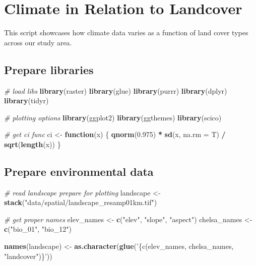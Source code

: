 \documentclass[]{article}
\newenvironment{Shaded}{\begin{snugshade}}{\end{snugshade}}
\newcommand{\CommentTok}[1]{\textcolor[rgb]{0.56,0.35,0.01}{\textit{#1}}}
\newcommand{\ControlFlowTok}[1]{\textcolor[rgb]{0.13,0.29,0.53}{\textbf{#1}}}
\newcommand{\DataTypeTok}[1]{\textcolor[rgb]{0.13,0.29,0.53}{#1}}
\newcommand{\FloatTok}[1]{\textcolor[rgb]{0.00,0.00,0.81}{#1}}
\newcommand{\KeywordTok}[1]{\textcolor[rgb]{0.13,0.29,0.53}{\textbf{#1}}}
\newcommand{\NormalTok}[1]{#1}
\newcommand{\OperatorTok}[1]{\textcolor[rgb]{0.81,0.36,0.00}{\textbf{#1}}}
\newcommand{\StringTok}[1]{\textcolor[rgb]{0.31,0.60,0.02}{#1}}
\begin{document}
\hypertarget{climate-in-relation-to-landcover}{%
\section{Climate in Relation to Landcover}\label{climate-in-relation-to-landcover}}

This script showcases how climate data varies as a function of land cover types across our study area.

\hypertarget{prepare-libraries-2}{%
\subsection{Prepare libraries}\label{prepare-libraries-2}}

\begin{Shaded}
\begin{Highlighting}[numbers=left,,]
\CommentTok{# load libs}
\KeywordTok{library}\NormalTok{(raster)}
\KeywordTok{library}\NormalTok{(glue)}
\KeywordTok{library}\NormalTok{(purrr)}
\KeywordTok{library}\NormalTok{(dplyr)}
\KeywordTok{library}\NormalTok{(tidyr)}

\CommentTok{# plotting options}
\KeywordTok{library}\NormalTok{(ggplot2)}
\KeywordTok{library}\NormalTok{(ggthemes)}
\KeywordTok{library}\NormalTok{(scico)}

\CommentTok{# get ci func}
\NormalTok{ci <-}\StringTok{ }\ControlFlowTok{function}\NormalTok{(x) \{}
  \KeywordTok{qnorm}\NormalTok{(}\FloatTok{0.975}\NormalTok{) }\OperatorTok{*}\StringTok{ }\KeywordTok{sd}\NormalTok{(x, }\DataTypeTok{na.rm =}\NormalTok{ T) }\OperatorTok{/}\StringTok{ }\KeywordTok{sqrt}\NormalTok{(}\KeywordTok{length}\NormalTok{(x))}
\NormalTok{\}}
\end{Highlighting}
\end{Shaded}

\hypertarget{prepare-environmental-data}{%
\subsection{Prepare environmental data}\label{prepare-environmental-data}}

\begin{Shaded}
\begin{Highlighting}[numbers=left,,]
\CommentTok{# read landscape prepare for plotting}
\NormalTok{landscape <-}\StringTok{ }\KeywordTok{stack}\NormalTok{(}\StringTok{"data/spatial/landscape_resamp01km.tif"}\NormalTok{)}

\CommentTok{# get proper names}
\NormalTok{elev_names <-}\StringTok{ }\KeywordTok{c}\NormalTok{(}\StringTok{"elev"}\NormalTok{, }\StringTok{"slope"}\NormalTok{, }\StringTok{"aspect"}\NormalTok{)}
\NormalTok{chelsa_names <-}\StringTok{ }\KeywordTok{c}\NormalTok{(}\StringTok{"bio_01"}\NormalTok{, }\StringTok{"bio_12"}\NormalTok{)}

\KeywordTok{names}\NormalTok{(landscape) <-}\StringTok{ }\KeywordTok{as.character}\NormalTok{(}\KeywordTok{glue}\NormalTok{(}\StringTok{'\{c(elev_names, chelsa_names, "landcover")\}'}\NormalTok{))}
\end{Highlighting}
\end{Shaded}
\end{document}
